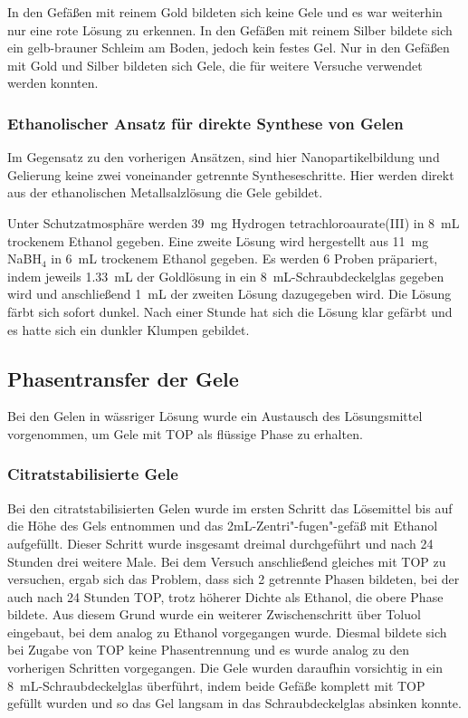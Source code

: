 			   	In den Gefäßen mit reinem Gold bildeten sich keine Gele und es war weiterhin nur eine rote Lösung zu erkennen.
			   	In den Gefäßen mit reinem Silber bildete sich ein gelb-brauner Schleim am Boden, jedoch kein festes Gel.
			   	Nur in den Gefäßen mit Gold und Silber bildeten sich Gele, die für weitere Versuche verwendet werden konnten.
			
		\subsubsection{Ethanolischer Ansatz für direkte Synthese von Gelen}
			Im Gegensatz zu den vorherigen Ansätzen, sind hier Nanopartikelbildung und Gelierung keine zwei voneinander getrennte Syntheseschritte.
			Hier werden direkt aus der ethanolischen Metallsalzlösung die Gele gebildet. \autocite{Georgi2019}
			
			Unter Schutzatmosphäre werden \SI{39}{\milli\gram} Hydrogen tetrachloroaurate(III) in \SI{8}{\milli\liter} trockenem Ethanol gegeben.
			Eine zweite Lösung wird hergestellt aus \SI{11}{\milli\gram} NaBH$_4$ in \SI{6}{\milli\liter} trockenem Ethanol gegeben.
			Es werden 6 Proben präpariert, indem jeweils \SI{1,33}{\milli\liter} der Goldlösung in ein \SI{8}{\milli\liter}-Schraubdeckelglas gegeben wird und anschließend \SI{1}{\milli\liter} der zweiten Lösung dazugegeben wird.
			Die Lösung färbt sich sofort dunkel.
			Nach einer Stunde hat sich die Lösung klar gefärbt und es hatte sich ein dunkler Klumpen gebildet.
			
	\subsection{Phasentransfer der Gele}
	
			Bei den Gelen in wässriger Lösung wurde ein Austausch des Lösungsmittel vorgenommen, um Gele mit TOP als flüssige Phase zu erhalten.
			\subsubsection{Citratstabilisierte Gele}
				Bei den citratstabilisierten Gelen wurde im ersten Schritt das Lösemittel bis auf die Höhe des Gels  entnommen und das 2mL-Zentri"-fugen"-gefäß mit Ethanol aufgefüllt.
				Dieser Schritt wurde insgesamt dreimal durchgeführt und nach 24 Stunden drei weitere Male.
				Bei dem Versuch anschließend gleiches mit TOP zu versuchen, ergab sich das Problem, dass sich 2 getrennte Phasen bildeten, bei der auch nach 24 Stunden TOP, trotz höherer Dichte als Ethanol, die obere Phase bildete.
				Aus diesem Grund wurde ein weiterer Zwischenschritt über Toluol eingebaut, bei dem analog zu Ethanol vorgegangen wurde.
				Diesmal bildete sich bei Zugabe von TOP keine Phasentrennung und es wurde analog zu den vorherigen Schritten vorgegangen.
				Die Gele wurden daraufhin vorsichtig in ein \SI{8}{\milli\liter}-Schraubdeckelglas überführt, indem beide Gefäße komplett mit TOP gefüllt wurden und so das Gel langsam in das Schraubdeckelglas absinken konnte.
			
